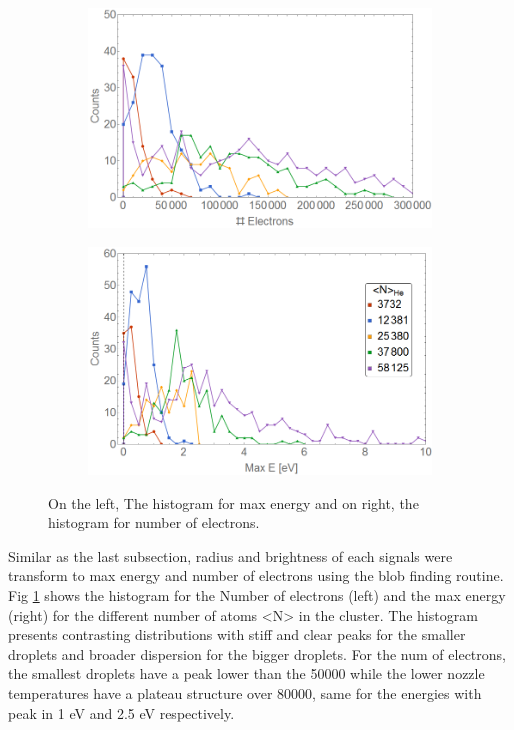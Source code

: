 \begin{figure}[h!]
\centering
\begin{subfigure}[l]{0.49\textwidth}
\includegraphics[width=1\textwidth]{../Images/results/NI_He_Dropletsize/HElectrones.png}   				\end{subfigure}
\begin{subfigure}[l]{0.49\textwidth}
\includegraphics[width=1\textwidth]{../Images/results/NI_He_Dropletsize/HEnerg2.png} 
\end{subfigure}
\caption[NIR He droplet size. histograms]{On the left, The histogram for max energy and on right, the histogram for number of electrons.}
\label{fig:NIRHehistosize}
\end{figure}

Similar as the last subsection, radius and brightness of each signals were transform to max energy and number of electrons using the blob finding routine. Fig \ref{fig:NIRHehistosize} shows the histogram for the Number of electrons (left) and the max energy (right) for the different number of atoms  <N> in the cluster. The histogram presents contrasting distributions with stiff and clear peaks for the smaller droplets and broader dispersion for the bigger droplets. For the num of electrons, the smallest droplets have a peak lower than the 50000 while the lower nozzle temperatures have a plateau structure over 80000, same for the energies with peak in 1 eV and 2.5 eV respectively.

